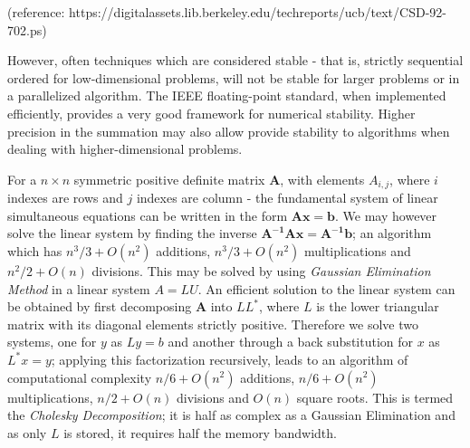 \documentclass[7pt]{article}
\begin{document}
(reference: https://digitalassets.lib.berkeley.edu/techreports/ucb/text/CSD-92-702.ps)

However, often techniques which are considered stable - that is, strictly sequential ordered for low-dimensional problems, will not be stable for larger problems or in a parallelized algorithm. The IEEE floating-point standard, when implemented efficiently, provides a very good framework for numerical stability.  Higher precision in the summation may also allow provide stability to algorithms when dealing with higher-dimensional problems. 

For a $n \times n$ symmetric positive definite matrix $\mathbf{A}$, with elements $A_{i,j}$, where $i$ indexes are rows and $j$ indexes are column - the fundamental system of linear simultaneous equations can be written in the form $\mathbf{A x = b}$.  We may however solve the linear system by finding the inverse $\mathbf{A^{-1} A x = A^{-1}  b}$; an algorithm which has $n^3/3 + O(n^2)$ additions, $n^3/3 + O(n^2)$ multiplications and $n^2/2 + O(n)$ divisions. This may be solved by using \emph{Gaussian Elimination Method} in a linear system $A = L U$. An efficient solution to the linear system can be obtained by first decomposing $\mathbf{A}$ into $L L^{*}$, where $L$ is the lower triangular matrix with its diagonal elements strictly positive. Therefore we solve two systems, one for $y$ as $L y = b$ and another through a back substitution for $x$ as $L^* x = y$; applying this factorization recursively, leads to an algorithm of computational complexity $n/6 + O(n^2)$ additions, $n/6 + O(n^2)$ multiplications, $n/2 + O(n)$ divisions and $O(n)$ square roots. This is termed the \emph{Cholesky Decomposition}; it is half as complex as a Gaussian Elimination and as only $L$ is stored, it requires half the memory bandwidth. 
\end{document}
